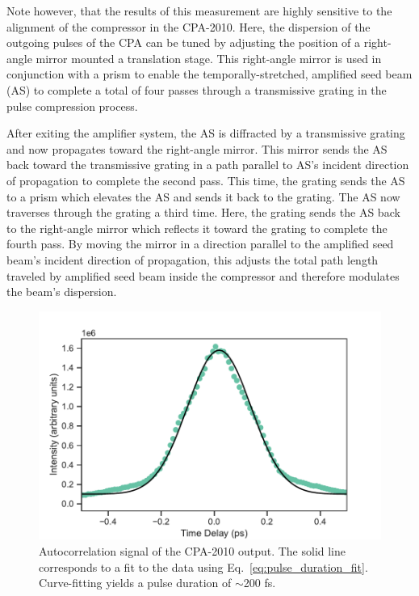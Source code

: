 Note however, that the results of this measurement are highly sensitive to the alignment of the compressor in the CPA-2010. Here, the dispersion of the outgoing pulses of the CPA can be tuned by adjusting the position of a right-angle mirror mounted a translation stage. This right-angle mirror is used in conjunction with a prism to enable the temporally-stretched, amplified seed beam (AS) to complete a total of four passes through a transmissive grating in the pulse compression process.

After exiting the amplifier system, the AS is diffracted by a transmissive grating and now propagates toward the right-angle mirror. This mirror sends the AS back toward the transmissive grating in a path parallel to AS's incident direction of propagation to complete the second pass. This time, the grating sends the AS to a prism which elevates the AS and sends it back to the grating. The AS now traverses through the grating a third time. Here, the grating sends the AS back to the right-angle mirror which reflects it toward the grating to complete the fourth pass. By moving the mirror in a direction parallel to the amplified seed beam's incident direction of propagation, this adjusts the total path length traveled by amplified seed beam inside the compressor and therefore modulates the beam's dispersion.


\begin{figure}[ht]
	\centering
	\includegraphics[scale=0.6]{images/chapter_methods/cpa_autocorr}
	\caption{Autocorrelation signal of the CPA-2010 output. The solid line corresponds to a fit to the data using Eq.\ \eqref{eq:pulse_duration_fit}. Curve-fitting yields a pulse duration of $\sim$200 fs.}
	\label{fig:cpa_autocorr}
\end{figure}

